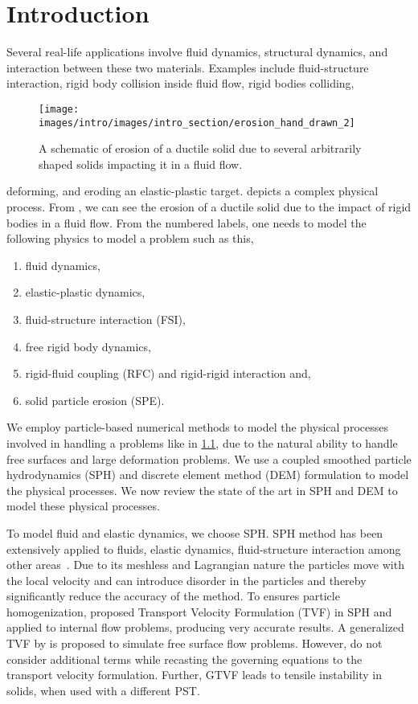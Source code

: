 \chapter{Introduction}
\label{chap:intro}
Several real-life applications involve fluid dynamics, structural dynamics, and
interaction between these two materials. Examples include fluid-structure
interaction, rigid body collision inside fluid flow, rigid bodies colliding,
\begin{figure}[!htpb]
  \centering
  \texttt{[image: images/intro/images/intro\_section/erosion\_hand\_drawn\_2]}
  \caption{A schematic of erosion of a ductile solid due to several arbitrarily
    shaped solids impacting it in a fluid flow.}
\label{fig:intro-big-picture}
\end{figure}
deforming, and eroding an elastic-plastic target. 
depicts a complex physical process. From , we can
see the erosion of a ductile solid due to the impact of rigid bodies in a fluid
flow. From the numbered labels, one needs to model the following physics to
model a problem such as this,
\begin{enumerate}
\item fluid dynamics,
\item elastic-plastic dynamics,
\item fluid-structure interaction (FSI),
\item free rigid body dynamics,
\item rigid-fluid coupling (RFC) and rigid-rigid interaction and,
\item solid particle erosion (SPE).
\end{enumerate}
We employ particle-based numerical methods to model the physical processes
involved in handling a problems like in \cref{fig:intro-big-picture}, due to the
natural ability to handle free surfaces and large deformation problems. We use a coupled
smoothed particle hydrodynamics (SPH) and discrete element method (DEM)
formulation to model the physical processes. We now review the state of the art
in SPH and DEM to model these physical processes.


To model fluid and elastic dynamics, we choose SPH. SPH method has been
extensively applied to fluids, elastic dynamics, fluid-structure interaction
among other areas~\parencite{monaghan2012smoothed}. Due to its meshless and
Lagrangian nature the particles move with the local velocity and can introduce
disorder in the particles and thereby significantly reduce the accuracy of the
method. To ensures particle homogenization, \textcite{Adami2013} proposed
Transport Velocity Formulation (TVF) in SPH and applied to internal flow
problems, producing very accurate results. A generalized TVF by
\textcite{zhang_hu_adams17} is proposed to simulate free surface flow problems.
However, \textcite{Adami2013,zhang_hu_adams17} do not consider additional terms
while recasting the governing equations to the transport velocity formulation.
Further, GTVF leads to tensile instability in solids, when used with a different
PST.


